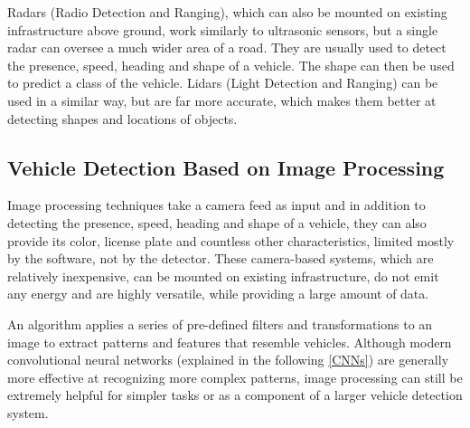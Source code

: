 Radars (Radio Detection and Ranging), which can also be mounted on existing
infrastructure above ground, work similarly to ultrasonic sensors, but a single
radar can oversee a much wider area of a road.\cite{RadarSensors} They are
usually used to detect the presence, speed, heading and shape of a vehicle. The
shape can then be used to predict a class of the vehicle. Lidars (Light
Detection and Ranging) can be used in a similar way, but are far more accurate,
which makes them better at detecting shapes and locations of objects.



\subsection{Vehicle Detection Based on Image Processing}







Image processing techniques take a camera feed as input and in addition to
detecting the presence, speed, heading and shape of a vehicle, they can also
provide its color, license plate and countless other characteristics, limited
mostly by the software, not by the detector. These camera-based systems, which
are relatively inexpensive, can be mounted on existing infrastructure, do not
emit any energy and are highly versatile, while providing a large amount of
data.

An algorithm applies a series of pre-defined filters and transformations to an
image to extract patterns and features that resemble vehicles. Although modern
convolutional neural networks (explained in the following \autoref{CNNs}) are
generally more effective at recognizing more complex patterns, image processing
can still be extremely helpful for simpler tasks or as a component of a larger
vehicle detection system.

